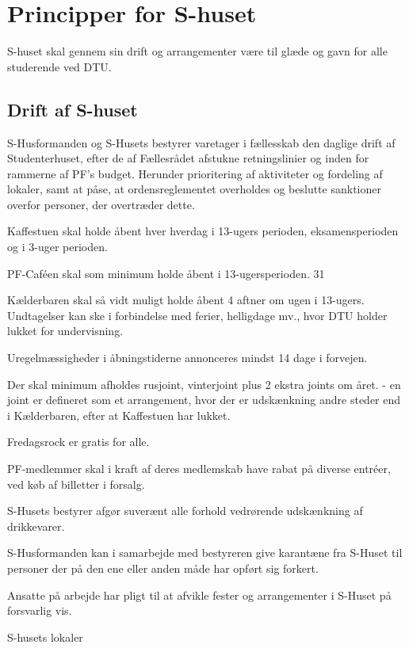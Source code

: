 \section{Principper for S-huset}
S-huset skal gennem sin drift og arrangementer være til glæde og gavn for alle studerende ved DTU.
\subsection{Drift af S-huset}
\begin{list}{•}
\item S-Husformanden og S-Husets bestyrer varetager i fællesskab den daglige drift af Studenterhuset, efter de af
Fællesrådet afstukne retningslinier og inden for rammerne af PF's budget. Herunder prioritering af aktiviteter og
fordeling af lokaler, samt at påse, at ordensreglementet overholdes og beslutte sanktioner overfor personer, der
overtræder dette.
\item Kaffestuen skal holde åbent hver hverdag i 13-ugers perioden, eksamensperioden og i 3-uger perioden.
\item PF-Caféen skal som minimum holde åbent i 13-ugersperioden.
31
\item Kælderbaren skal så vidt muligt holde åbent 4 aftner om ugen i 13-ugers. Undtagelser kan ske i forbindelse med
ferier, helligdage mv., hvor DTU holder lukket for undervisning.
\item Uregelmæssigheder i åbningstiderne annonceres mindst 14 dage i forvejen.
\item Der skal minimum afholdes rusjoint, vinterjoint plus 2 ekstra joints om året.
- en joint er defineret som et arrangement, hvor der er udskænkning andre steder end i Kælderbaren, efter at
Kaffestuen har lukket.
\item Fredagsrock er gratis for alle.
\item PF-medlemmer skal i kraft af deres medlemskab have rabat på diverse entréer, ved køb af billetter i forsalg.
\item S-Husets bestyrer afgør suverænt alle forhold vedrørende udskænkning af drikkevarer.
\item S-Husformanden kan i samarbejde med bestyreren give karantæne fra S-Huset til personer der på den ene eller
anden måde har opført sig forkert.
\item Ansatte på arbejde har pligt til at afvikle fester og arrangementer i S-Huset på forsvarlig vis.
\end{list}
S-husets lokaler
